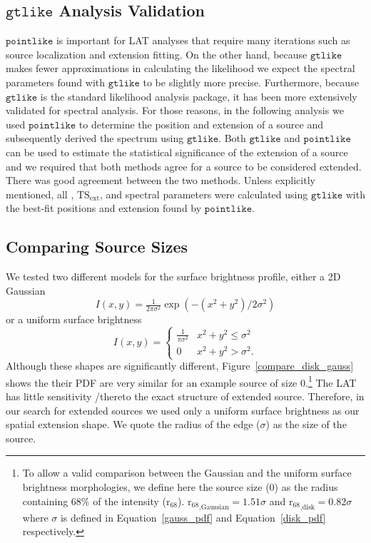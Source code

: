 \documentclass[12pt,preprint]{aastex}
\newcommand{\tsext}{{\ensuremath{\text{TS}_{\text{ext}}}}\xspace}
\newcommand{\rsixeight}{{\ensuremath{\text{r}_{68}}}\xspace}
\newcommand{\ts}{\text{TS}\xspace}
\newcommand{\gtlike}{\ensuremath{\mathtt{gtlike}}\xspace}
\newcommand{\pointlike}{\ensuremath{\mathtt{pointlike}}\xspace}
\begin{document}
\subsection{\gtlike Analysis Validation}
\label{gtlike_crosscheck}

\pointlike is important for LAT analyses that require many iterations
such as source localization and extension fitting.  On the other hand,
because \gtlike makes fewer approximations in calculating the likelihood
we expect the spectral parameters found with \gtlike to be slightly more
precise.  Furthermore, because \gtlike is the standard likelihood analysis
package, it has been more extensively validated for spectral analysis.
For those reasons, in the following analysis we used \pointlike to
determine the position and extension of a source and subsequently derived
the spectrum using \gtlike. Both \gtlike and \pointlike can be used to
estimate the statistical significance of the extension of a source and we
required that both methods agree for a source to be considered extended.
There was good agreement between the two methods.  Unless explicitly
mentioned, all \ts, \tsext, and spectral parameters were calculated using
\gtlike with the best-fit positions and extension found by \pointlike.


\subsection{Comparing Source Sizes}

\label{compare_source_size}

We tested two different models for the
surface brightness profile, either a 2D Gaussian
\begin{equation}\label{gauss_pdf}
  I(x,y)=\tfrac{1}{2\pi\sigma^2}\exp\left(-(x^2+y^2)/2\sigma^2\right)
\end{equation}
or a uniform surface brightness
\begin{equation}\label{disk_pdf}
  I(x,y)=
  \begin{cases}
    \frac{1}{\pi\sigma^2} & x^2+y^2\le\sigma^2 \\
    0                      & x^2+y^2>\sigma^2.
  \end{cases}
\end{equation}
Although these shapes are significantly different, 
Figure~\ref{compare_disk_gauss} shows the their PDF 
are very similar for an example source of size
0.\footnote{To
allow a valid comparison between the Gaussian and the uniform surface
brightness morphologies,
we define here the source size (0) 
as the radius containing
68\% of the intensity ($\rsixeight$).  $\rsixeight_\text{,Gaussian}=1.51\sigma$
and $\rsixeight_\text{,disk}=0.82\sigma$ where $\sigma$
is defined in Equation~\ref{gauss_pdf} and
Equation~\ref{disk_pdf} respectively.} The LAT 
has little sensitivity /thereto the exact structure of extended source.
Therefore, in our search for extended sources we used only a uniform
surface brightness as our spatial extension shape. We quote the radius
of the edge ($\sigma$) as the size of the source.
\end{document}

